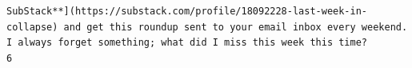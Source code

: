 \documentclass[
  letterpaper,
  DIV=11,
  numbers=noendperiod]{scrreprt}
\begin{document}
\begin{verbatim}
SubStack**](https://substack.com/profile/18092228-last-week-in-collapse) and get this roundup sent to your email inbox every weekend. I always forget something; what did I miss this week this time?
6                                                                                                                                                                                                                                                                                                                                                                                                                                                                                                                                                                                                                                                                                                                                                                                                                                                                                                                                                                                                                                                                                                                                                                                                                                                                                                                                                                                                                                                                                                                                                                                                                                                                                                                                                                                                                                                                                                                                                                                                                                                                                                                                                                                                                                                                                                                                                                                                                                                                                                                                                                                                                                                                                                                                                                                                                                                                                                                                                                                                                                                                                                                                                                                                                                                
\end{verbatim}
\end{document}
